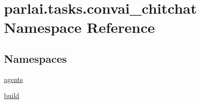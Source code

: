 \hypertarget{namespaceparlai_1_1tasks_1_1convai__chitchat}{}\section{parlai.\+tasks.\+convai\+\_\+chitchat Namespace Reference}
\label{namespaceparlai_1_1tasks_1_1convai__chitchat}
\subsection*{Namespaces}
\begin{DoxyCompactItemize}
\item 
 \hyperlink{namespaceparlai_1_1tasks_1_1convai__chitchat_1_1agents}{agents}
\item 
 \hyperlink{namespaceparlai_1_1tasks_1_1convai__chitchat_1_1build}{build}
\end{DoxyCompactItemize}
